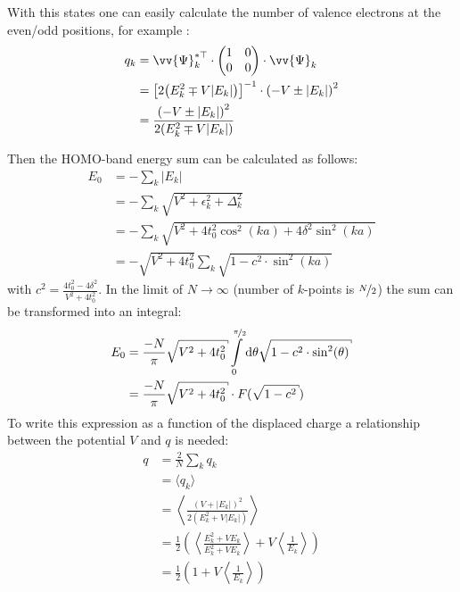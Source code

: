 With this states one can easily calculate the number of valence electrons at the even/odd positions, for example :
\begin{align}
q_k &= \vv{\Psi}_k^{*\top}\cdot\begin{pmatrix*}[c]
1 & 0\\
0 & 0
\end{pmatrix*}\cdot \vv{\Psi}_k\\
&= \left[2\left(E_k^2\mp V|E_k|\right)\right]^{-1} \cdot \left(-V\pm |E_k|\right)^2\\
&= \frac{\left(-V \pm |E_k|\right)^2}{2\left(E_k^2\mp V|E_k|\right)}
\end{align}

Then the HOMO-band energy sum can be calculated as follows:
\begin{align}
E_0 &= -\sum_k |E_k|\\
&= -\sum_k \sqrt{V^2+\epsilon_k^2+\Delta_k^2}\\
&= -\sum_k \sqrt{V^2 + 4t_0^2\cos^2(ka) + 4 \delta^2\sin^2(ka)}\\
&= -\sqrt{V^2 + 4t_0^2}\sum_k \sqrt{1 - c^2 \cdot \sin^2(ka)}
\end{align} 
with $c^2 = \frac{4t_0^2-4\delta^2}{V^2+4t_0^2}$. In the limit of $N \to \infty$ (number of $k$-points is $\nicefrac{N}{2}$) the sum can be transformed into an integral:
\begin{align}
E_0 &= \frac{-N}{\pi} \sqrt{V^2+4t_0^2} \int\limits_{0}^{\nicefrac{\pi}{2}} \text{d}\theta \sqrt{1 - c^2 \cdot \sin^2(\theta)}\\
&= \frac{-N}{\pi} \sqrt{V^2+4t_0^2} \cdot F(\sqrt{1-c^2}) 
\end{align}
To write this expression as a function of the displaced charge a relationship between the potential $V$ and $q$ is needed:
\begin{align}
q &= \frac{2}{N} \sum_k q_k\\
&= \langle q_k\rangle\\
&= \left\langle\frac{\left(V + |E_k|\right)^2}{2\left(E_k^2+ V|E_k|\right)}\right\rangle\\
&= \frac{1}{2} \left(\left\langle\frac{E_k^2+VE_k}{E_k^2+VE_k}\right\rangle + V\left\langle\frac{1}{E_k}\right\rangle\right)\\
&= \frac{1}{2} \left(1 + V \left\langle\frac{1}{E_k}\right\rangle\right)
\end{align}